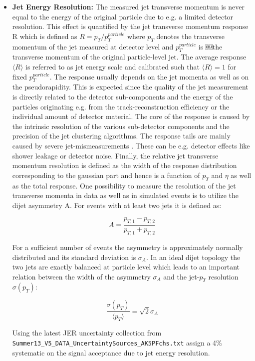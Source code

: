\begin{itemize}
	\item \textbf{Jet Energy Resolution:}  The measured jet transverse momentum is never equal to the energy of the original particle due to e.g. a limited detector resolution. This effect is quantified by the jet transverse momentum response R which is defined as $R = p_{T} / p_{T}^{particle}$  where $p_{T}$ denotes the transverse momentum of the jet measured at detector level and $p_{T}^{particle}$ is ￼the transverse momentum of the original particle-level jet. The average response $\langle R \rangle$ is referred to as jet energy scale and calibrated such that $\langle R \rangle = 1$ for fixed $p_{T}^{particle}$. The response usually depends on the jet momenta as well as on the pseudorapidity. This is expected since the quality of the jet measurement is directly related to the detector sub-components and the energy of the particles originating e.g. from the track-reconstruction efficiency or the individual amount of detector material. The core of the response is caused by the intrinsic resolution of the various sub-detector components and the precision of the jet clustering algorithms. The response tails are mainly caused by severe jet-mismeasurements \cite{Khachatryan:2016kdb}. These can be e.g. detector effects like shower leakage or detector noise. Finally, the relative jet transverse momentum resolution is defined as the width of the response distribution corresponding to the gaussian part and hence is a function of $p_{T}$ and $\eta$ as well as the total response. One possibility to measure the resolution of the jet transverse momenta in data as well as in simulated events is to utilize the dijet asymmetry A. For events with at least two jets it is defined as:
	
	\begin{equation}
	A = \frac{p_{T,1} - p_{T,2}}{p_{T,1} + p_{T,2}}
	\end{equation}
	
	For a sufficient number of events the asymmetry is approximately normally distributed and its standard deviation is $\sigma_{A}$. In an ideal dijet topology the two jets are exactly balanced at particle level which leads to an important relation between the width of the asymmetry $\sigma_{A}$ and the jet-$p_{T}$ resolution $\sigma(p_{T})$:
	
	\begin{equation}
	\frac{\sigma(p_{T})}{\langle p_{T} \rangle} = \sqrt{2} \sigma_{A}
	\end{equation}
	
	Using the latest JER uncertainty collection from \texttt{Summer13\_\-V5\_DATA\_\-Uncertainty\-Sources\_\-AK5PFchs.txt} assign a 4\% systematic on the signal acceptance due to jet energy resolution. 
	

\end{itemize}

